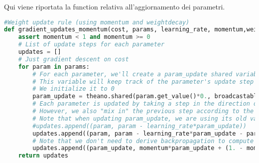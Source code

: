 Qui viene riportata la function relativa all'aggiornamento dei parametri.

\begin{lstlisting}[language=Python]
#Weight update rule (using momentum and weightdecay)
def gradient_updates_momentum(cost, params, learning_rate, momentum,weight_decay):
    assert momentum < 1 and momentum >= 0
    # List of update steps for each parameter
    updates = []
    # Just gradient descent on cost
    for param in params:
        # For each parameter, we'll create a param_update shared variable.
        # This variable will keep track of the parameter's update step across iterations.
        # We initialize it to 0
        param_update = theano.shared(param.get_value()*0., broadcastable=param.broadcastable)
        # Each parameter is updated by taking a step in the direction of the gradient.
        # However, we also "mix in" the previous step according to the given momentum value.
        # Note that when updating param_update, we are using its old value and also the new gradient step.
        #updates.append((param, param - learning_rate*param_update))
        updates.append((param, param - learning_rate*param_update - param_update*weight_decay*learning_rate))
        # Note that we don't need to derive backpropagation to compute updates - just use T.grad!
        updates.append((param_update, momentum*param_update + (1. - momentum)*T.grad(cost, param)))
    return updates
\end{lstlisting}

